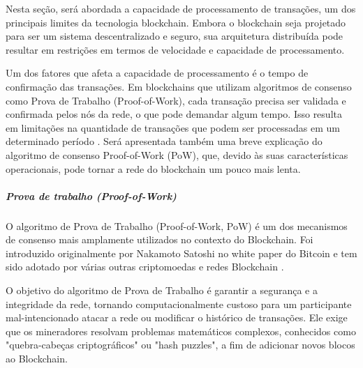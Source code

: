 

Nesta seção, será abordada a capacidade de processamento de transações, um dos principais limites da tecnologia blockchain. Embora o blockchain seja projetado para ser um sistema descentralizado e seguro, sua arquitetura distribuída pode resultar em restrições em termos de velocidade e capacidade de processamento.

Um dos fatores que afeta a capacidade de processamento é o tempo de confirmação das transações. Em blockchains que utilizam algoritmos de consenso como Prova de Trabalho (Proof-of-Work), cada transação precisa ser validada e confirmada pelos nós da rede, o que pode demandar algum tempo. Isso resulta em limitações na quantidade de transações que podem ser processadas em um determinado período \cite{yang2019effective}.
Será apresentada também uma breve explicação do algoritmo de consenso Proof-of-Work (PoW), que, devido às suas características operacionais, pode tornar a rede do blockchain um pouco mais lenta.

\subparagraph{ \textbf{Prova de trabalho (Proof-of-Work)}}

O algoritmo de Prova de Trabalho (Proof-of-Work, PoW) é um dos mecanismos de consenso mais amplamente utilizados no contexto do Blockchain\cite{buterin2019next}. Foi introduzido originalmente por Nakamoto Satoshi no white paper do Bitcoin e tem sido adotado por várias outras criptomoedas e redes Blockchain \cite{Blockchain-Satochi}.

O objetivo do algoritmo de Prova de Trabalho é garantir a segurança e a integridade da rede, tornando computacionalmente custoso para um participante mal-intencionado atacar a rede ou modificar o histórico de transações. Ele exige que os mineradores resolvam problemas matemáticos complexos, conhecidos como "quebra-cabeças criptográficos" ou "hash puzzles", a fim de adicionar novos blocos ao Blockchain.\cite{yang2019effective}

